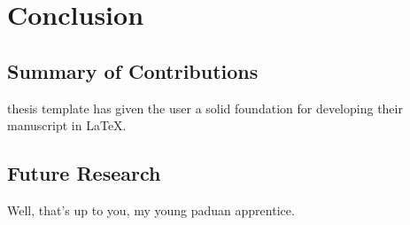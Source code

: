 
\chapter{Conclusion}
	\label{chapter:conclusion}%

\section{Summary of Contributions}

 thesis template has given the user a solid foundation for developing their manuscript in \LaTeX.

\section{Future Research}

Well, that's up to you, my young paduan apprentice.


